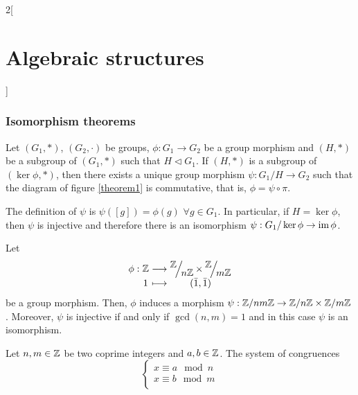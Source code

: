 \documentclass[../../../main.tex]{subfiles}
\begin{document}
\begin{multicols}{2}[\section{Algebraic structures}]
  \subsubsection*{Isomorphism theorems}
  \begin{theorem}
    Let $(G_1,*)$, $(G_2,\cdot)$ be groups, $\phi:G_1\rightarrow G_2$ be a group morphism and $(H,*)$ be a subgroup of $(G_1,*)$ such that $H\lhd G_1$. If $(H,*)$ is a subgroup of $(\ker\phi,*)$, then there exists a unique group morphism $\psi:G_1/H\rightarrow G_2$ such that the diagram of figure \ref{theorem1} is commutative, that is, $\phi=\psi\circ\pi$.
    \begin{center}
      \begin{minipage}{\linewidth}
        \centering
        
        \label{theorem1}
      \end{minipage}
    \end{center}
    The definition of $\psi$ is $\psi([g])=\phi(g)$ $\forall g\in G_1$.
    In particular, if $H=\ker\phi$, then $\psi$ is injective and therefore there is an isomorphism $\psi:G_1/\ker\phi\rightarrow\im\phi$.
  \end{theorem}
  \begin{theorem}
    Let
    \begin{equation*}
      \begin{array}{r@{\hspace{0.5\tabcolsep}}c@{\hspace{0.5\tabcolsep}}c@{\hspace{0.5\tabcolsep}}c}
        \phi: & \ZZ & \longrightarrow & \displaystyle\quot{\ZZ }{n\ZZ }\times\quot{\ZZ }{m\ZZ } \\
              & 1   & \longmapsto     & (\Bar{1},\Bar{1})
      \end{array}
    \end{equation*}
    be a group morphism. Then, $\phi$ induces a morphism $\psi:\ZZ /nm\ZZ \rightarrow\ZZ /n\ZZ \times\ZZ /m\ZZ $. Moreover, $\psi$ is injective if and only if $\gcd(n,m)=1$ and in this case $\psi$ is an isomorphism.
  \end{theorem}
  \begin{corollary}
    Let $n,m\in\ZZ $ be two coprime integers and $a,b\in\ZZ $. The system of congruences $$\left\{\begin{array}{l}
        x\equiv a\mod{n} \\
        x\equiv b\mod{m} \\

\end{array}$$
\end{corollary}
\end{multicols}
\end{document}
